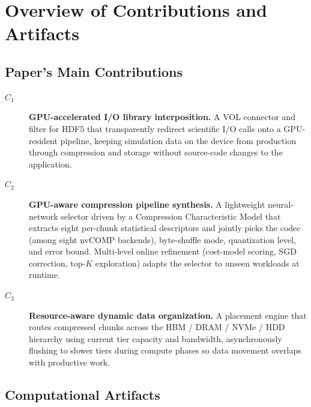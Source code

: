 \documentclass[conference]{IEEEtran}
\begin{document}


\appendixAD

\section{Overview of Contributions and Artifacts}

\subsection{Paper's Main Contributions}

\begin{description}
\item[$C_1$] \textbf{GPU-accelerated I/O library interposition.} A VOL
  connector and filter for HDF5 that
  transparently redirect scientific I/O calls onto a GPU-resident
  pipeline, keeping simulation data on the device from production
  through compression and storage without source-code changes to the
  application.
\item[$C_2$] \textbf{GPU-aware compression pipeline synthesis.} A
  lightweight neural-network selector driven by a Compression
  Characteristic Model that extracts eight per-chunk statistical
  descriptors and jointly picks the codec (among eight nvCOMP
  backends), byte-shuffle mode, quantization level, and error bound.
  Multi-level online refinement (cost-model scoring, SGD correction,
  top-$K$ exploration) adapts the selector to unseen workloads at
  runtime.
\item[$C_3$] \textbf{Resource-aware dynamic data organization.} A
  placement engine that routes compressed chunks across the HBM /
  DRAM / NVMe / HDD hierarchy using current tier capacity and
  bandwidth, asynchronously flushing to slower tiers during compute
  phases so data movement overlaps with productive work.
\end{description}


\subsection{Computational Artifacts}
\end{document}
